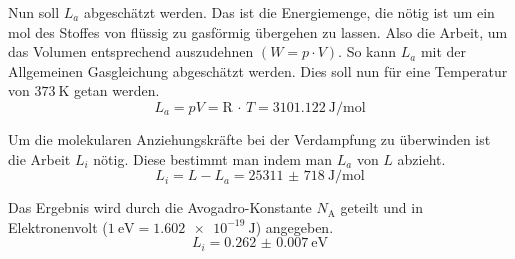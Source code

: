 \documentclass[
  bibliography=totoc,     %
  captions=tableheading,  %
  titlepage=firstiscover, %
]{scrartcl}
\begin{document}
Nun soll $L_a$ abgeschätzt werden. Das ist die Energiemenge, die nötig ist um ein mol des Stoffes von
flüssig zu gasförmig übergehen zu lassen. Also die Arbeit, um das Volumen entsprechend auszudehnen $\left( W = p \cdot V \right)$.
So kann $L_a$ mit der Allgemeinen Gasgleichung abgeschätzt werden. Dies soll nun für eine Temperatur von $\SI{373}{\kelvin}$ getan werden.
\begin{equation}
  L_a = pV = \mathup{R} \, \cdot \, T = \SI{3101.122}{\joule\per\mol}
  \label{eqn:La}
\end{equation}

Um die molekularen Anziehungskräfte bei der Verdampfung zu überwinden ist die Arbeit $L_i$ nötig.
Diese bestimmt man indem man $L_a$ von $L$ abzieht.
\begin{equation}
  L_i = L - L_a = \SI{25311(718)}{\joule\per\mol}
\end{equation}

Das Ergebnis wird durch die Avogadro-Konstante $N_{\mathup{A}}$ \cite{chemav} geteilt und in
Elektronenvolt ($\SI{1}{\electronvolt} = \SI{1.602e-19}{\joule}$) angegeben.
\begin{equation}
  L_i = \SI{0.262(7)}{\electronvolt}
\end{equation}
\end{document}
